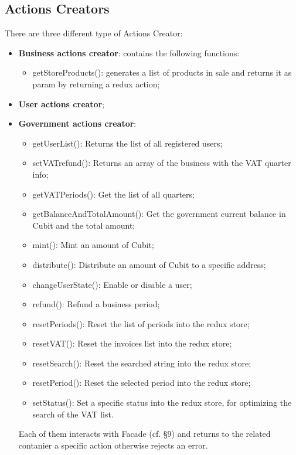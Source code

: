 \subsection{Actions Creators}
There are three different type of Actions Creator:
\begin{itemize}
	\item \textbf{Business actions creator}: contains the following functions: 
	\begin{itemize}
		\item getStoreProducts(): generates a list of products in sale and returns it as param by returning a redux action;
	\end{itemize}
	\item \textbf{User actions creator};
	\item \textbf{Government actions creator}:
	\begin{itemize}
		\item getUserList(): Returns the list of all registered users;
		\item setVATrefund(): Returns an array of the business with the VAT quarter info;
		\item getVATPeriods(): Get the list of all quarters;
		\item getBalanceAndTotalAmount(): Get the government current balance in Cubit and the total amount;
		\item mint(): Mint an amount of Cubit;
		\item distribute(): Distribute an amount of Cubit to a specific address;
		\item changeUserState(): Enable or disable a user;
		\item refund(): Refund a business period;
		\item resetPeriods(): Reset the list of periods into the redux store;
		\item resetVAT(): Reset the invoices list into the redux store;
		\item resetSearch(): Reset the searched string into the redux store;
		\item resetPeriod(): Reset the selected period into the redux store;
		\item setStatus(): Set a specific status into the redux store, for optimizing the search of the VAT list.
	\end{itemize}
Each of them interacts with Facade (cf. §9) and returns to the related contanier a specific action otherwise rejects an error.

\end{itemize}
